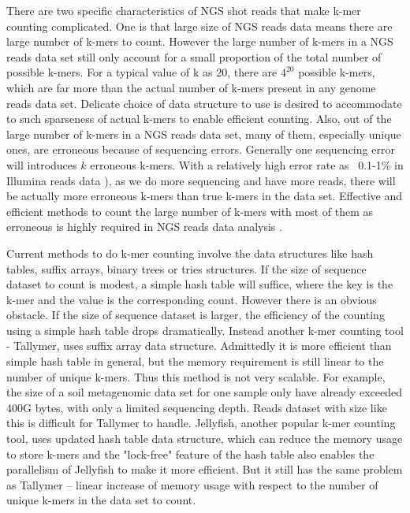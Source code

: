 There are two specific characteristics of NGS shot reads that make k-mer
counting complicated. One is that large size of NGS reads data means there are
large number of
k-mers to count. However the large number of k-mers in a NGS reads data set
still only account for a small proportion of the total number of possible k-mers.
For a typical value of k as 20, there are $4^{20}$ possible k-mers, which are
far more than the actual number of k-mers present in any genome reads data set.
Delicate choice of data structure to use is desired to accommodate to such
sparseness of actual k-mers to enable efficient counting. Also, out of the
large number of k-mers in a NGS reads data set, many of them, especially unique
ones, are erroneous because of sequencing errors. Generally one sequencing error will
introduces $k$ erroneous k-mers. With a relatively high error rate as ~0.1-1\%
in Illumina reads data \cite{pubmed19997069}), as we do more sequencing and have
more reads, there will be actually more erroneous k-mers than true k-mers in
the data set. Effective and efficient methods to count the large number of
k-mers with most of them as erroneous is highly required in NGS reads data
analysis \cite{Minoche2011}.

Current methods to do k-mer counting involve the data structures like hash
tables, suffix arrays, binary trees or tries structures. If the size of
sequence dataset to count is modest, a simple hash table will suffice,
where the key is the k-mer and the value is the corresponding count. However
there is an obvious obstacle. If the size of sequence dataset is larger, the
efficiency of the counting using a simple hash table drops dramatically.
Instead another k-mer counting tool - Tallymer, uses suffix array data
structure\cite{Kurtz2008}. Admittedly it is more efficient than simple hash table in
general, but the memory requirement is still linear to the number of
unique k-mers. Thus this method is not very scalable. For example,
the size of a soil metagenomic data set for one sample only have already 
exceeded 400G bytes, with only a limited sequencing depth\cite{Howe2014}.
 Reads dataset with size like this is difficult for Tallymer to
handle. Jellyfish, \cite{Marcais2011} another popular k-mer counting tool,
uses updated hash table data structure, which can reduce the memory usage
to store k-mers and the "lock-free" feature of the hash table also enables the
parallelism of Jellyfish to make it more efficient. But it still has the same
problem as Tallymer – linear increase of memory usage with respect to the
number of unique k-mers in the data set to count.

